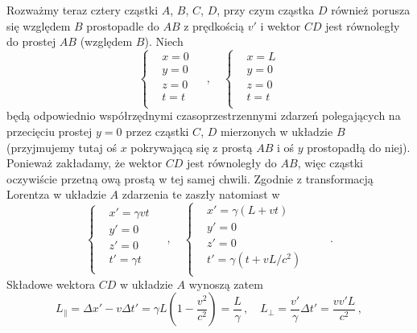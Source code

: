\documentclass[../main.tex]{subfiles}
\begin{document}
Rozważmy teraz cztery cząstki \(A\), $B$, $C$, $D$, przy czym cząstka $D$ również porusza się
względem $B$ prostopadle do $AB$ z prędkością \(v'\) i wektor \(CD\) jest równoległy do prostej
\(AB\) (względem \(B\)). Niech
\begin{equation*}
    \begin{cases}
    &x=0\\
    &y=0\\
    &z=0\\
    &t=t\\
    \end{cases}\quad\,,\quad
    \begin{cases}
     &x=L\\
     &y=0\\
     &z=0\\
     &t=t\\
    \end{cases}
\end{equation*}
będą odpowiednio współrzędnymi czasoprzestrzennymi zdarzeń polegających na przecięciu prostej
\(y=0\) przez cząstki \(C\), \(D\) mierzonych w układzie \(B\) (przyjmujemy tutaj oś \(x\)
pokrywającą się z prostą \(AB\) i oś \(y\) prostopadłą do niej). Ponieważ zakładamy, że wektor
\(CD\) jest równoległy do \(AB\), więc cząstki oczywiście przetną ową prostą w tej samej chwili.
Zgodnie z transformacją Lorentza w układzie \(A\) zdarzenia te zaszły natomiast w 
    \begin{equation*}
    \begin{cases}
    &x'=\gamma vt\\
    &y'=0\\
    &z'=0\\
    &t'=\gamma t\\
    \end{cases}\quad\,,\quad
    \begin{cases}
     &x'=\gamma(L+vt)\\
     &y'=0\\
     &z'=0\\
     &t'=\gamma(t+vL/c^2)\\
    \end{cases}\quad\quad\,.
\end{equation*}
Składowe wektora \(CD\) w układzie \(A\) wynoszą zatem
\begin{equation*}
    L_\parallel=\Delta x'-v\Delta t'=\gamma L\left(1-\frac{v^2}{c^2}\right)=\frac{L}{\gamma}\,,\quad L_\perp=\frac{v'}{\gamma}\Delta t'=\frac{vv'L}{c^2}\,,
\end{equation*}
\end{document}
